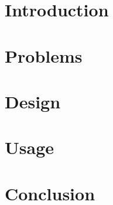 \documentclass{article}
\begin{document}

\section{Introduction}


\newpage
\section{Problems}


\newpage
\section{Design}


\newpage
\section{Usage}


\newpage
\section{Conclusion}

\end{document}
